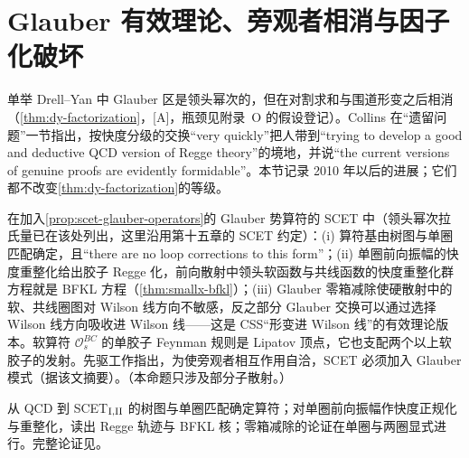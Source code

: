 \section{Glauber 有效理论、旁观者相消与因子化破坏}\label{sec:front-glauber}

单举 Drell--Yan 中 Glauber 区是领头幂次的，但在对割求和与围道形变之后相消\cite{Bodwin1985,CollinsSoperSterman1985b,CollinsSoperSterman1988}（\cref{thm:dy-factorization}，[A]，瓶颈见附录~O 的假设登记）。Collins 在“遗留问题”一节\cite[第~14.4.8~节，第~561--562~页]{Collins2011}指出，按快度分级的交换“very quickly”把人带到“trying to develop a good and deductive QCD version of Regge theory”的境地，并说“the current versions of genuine proofs are evidently formidable”。本节记录 2010 年以后的进展；它们都不改变\cref{thm:dy-factorization}的等级。

\begin{proposition}\label{prop:front-glauber-bfkl}
在加入\cref{prop:scet-glauber-operators}的 Glauber 势算符的 SCET 中（领头幂次拉氏量\cite[式~(5.21)]{RothsteinStewart2016}已在该处列出，这里沿用第十五章的 SCET 约定）：(i) 算符基由树图与单圈匹配确定，且“there are no loop corrections to this form”\cite[第~5.3~节]{RothsteinStewart2016}；(ii) 单圈前向振幅的快度重整化给出胶子 Regge 化，前向散射中领头软函数与共线函数的快度重整化群方程就是 BFKL 方程（\cref{thm:smallx-bfkl}）；(iii) Glauber 零箱减除使硬散射中的软、共线圈图对 Wilson 线方向不敏感，反之部分 Glauber 交换可以通过选择 Wilson 线方向吸收进 Wilson 线——这是 CSS“形变进 Wilson 线”的有效理论版本。软算符 $\mathcal O_s^{BC}$ 的单胶子 Feynman 规则是 Lipatov 顶点，它也支配两个以上软胶子的发射。先驱工作指出，为使旁观者相互作用自洽，SCET 必须加入 Glauber 模式\cite{Bauer:2010cc}（据该文摘要）。（本命题只涉及部分子散射。）
\end{proposition}

\begin{proofsketch}
从 QCD 到 SCET$_{\rm I,II}$ 的树图与单圈匹配确定算符；对单圈前向振幅作快度正规化与重整化，读出 Regge 轨迹与 BFKL 核；零箱减除的论证在单圈与两圈显式进行。完整论证见\cite[第~5、9--11~节]{RothsteinStewart2016}。
\end{proofsketch}

